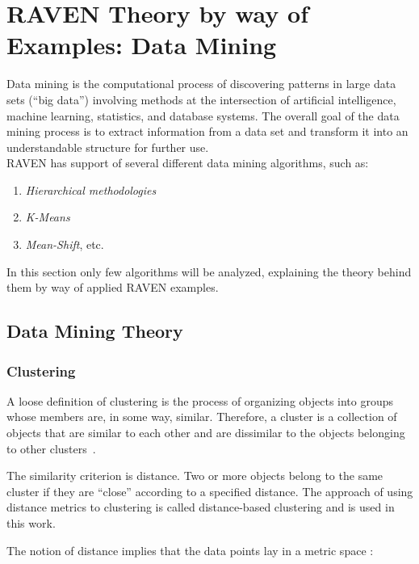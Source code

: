\section{RAVEN Theory by way of Examples: Data Mining}

Data mining is the computational process of discovering patterns in large data sets (``big data'') involving methods at the intersection of artificial intelligence, machine learning, statistics, and database systems. The overall goal of the data mining process is to extract information from a data set and transform it into an understandable structure for further use.
\\RAVEN has support of several different data mining algorithms,
such as:
\begin{enumerate}
  \item \textit{Hierarchical methodologies}
  \item \textit{K-Means}
  \item \textit{Mean-Shift}, etc.
\end{enumerate}
In this section only few algorithms will be analyzed, explaining the theory behind them
by way of applied RAVEN examples.

\subsection{Data Mining Theory}
\label{sec:dataMining}

\subsubsection{Clustering}
\label{clustering}
A loose definition of clustering is the process of organizing objects into groups whose members are, in some way, similar.
Therefore, a cluster is a collection of objects that are similar to each other and are dissimilar to the objects belonging to other clusters~\cite{SurveyClustering,MandelliClusteringRESS}.

The similarity criterion is distance. Two or more objects belong to the same cluster if they are ``close'' according to a specified distance. The approach of using distance metrics to clustering is called distance-based clustering and is used in this work.

The notion of distance implies that the data points lay in a metric space \cite{Mendelson75introduction}:

